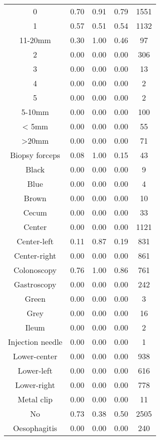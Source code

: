 \begin{center}
\begin{longtable}{|c|c|c|c|c|}
0  &   0.70  &  0.91  &  0.79  &  1551 \\
1  &   0.57  &  0.51  &  0.54  &  1132 \\
11-20mm  &   0.30  &  1.00  &  0.46  &    97 \\
2  &   0.00  &  0.00  &  0.00  &   306 \\
3  &   0.00  &  0.00  &  0.00  &    13 \\
4  &   0.00  &  0.00  &  0.00   &  2 \\
5  &   0.00  &  0.00  &  0.00   &  2 \\
5-10mm  &   0.00  &  0.00  &  0.00  &   100 \\
< 5mm  &   0.00  &  0.00  &  0.00  &    55 \\
>20mm  &   0.00  &  0.00  &  0.00  &    71 \\
Biopsy forceps  &   0.08  &  1.00  &  0.15  &    43 \\
Black  &   0.00  &  0.00  &  0.00   &  9 \\
Blue  &   0.00  &  0.00  &  0.00   &  4 \\
Brown  &   0.00  &  0.00  &  0.00  &    10 \\
Cecum  &   0.00  &  0.00  &  0.00  &    33 \\
Center  &   0.00  &  0.00  &  0.00  &  1121 \\
Center-left  &   0.11  &  0.87  &  0.19  &   831 \\
Center-right  &   0.00  &  0.00  &  0.00  &   861 \\
Colonoscopy  &   0.76  &  1.00  &  0.86  &   761 \\
Gastroscopy  &   0.00  &  0.00  &  0.00  &   242 \\
Green  &   0.00  &  0.00  &  0.00   &  3 \\
Grey  &   0.00  &  0.00  &  0.00  &    16 \\
Ileum  &   0.00  &  0.00  &  0.00   &  2 \\
Injection needle  &   0.00  &  0.00  &  0.00   &  1 \\
Lower-center  &   0.00  &  0.00  &  0.00  &   938 \\
Lower-left  &   0.00  &  0.00  &  0.00  &   616 \\
Lower-right  &   0.00  &  0.00  &  0.00  &   778 \\
Metal clip  &   0.00  &  0.00  &  0.00  &    11 \\
No  &   0.73  &  0.38  &  0.50  &  2505 \\
Oesophagitis  &   0.00  &  0.00  &  0.00  &   240 \\

\end{longtable}
\end{center}

